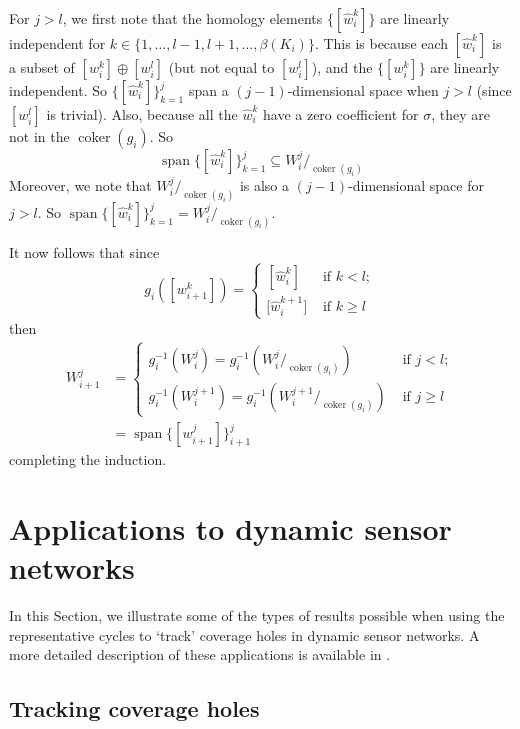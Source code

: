 \documentclass[12pt]{article}
\DeclareMathOperator{\coker}{coker}
\DeclareMathOperator{\spn}{span}
\begin{document}
For $j > l$, we first note that the homology elements $\{[\hat{w}_i^k]\}$ are linearly independent for $k\in \{1,\ldots,l-1,l+1,\ldots,\beta(K_i) \}$. This is because each $[\hat{w}_i^k]$ is a subset of $[w_i^k] \oplus [w_i^l]$ (but not equal to $[w_i^l]$), and the $\{[w_i^k]\}$ are linearly independent. So $\{[\hat{w}_i^k]\}_{k=1}^j$ span a $(j-1)$-dimensional space when $j>l$ (since $[w_i^l]$ is trivial). Also, because all the $\hat{w}_i^k$ have a zero coefficient for $\sigma$, they are not in the $\coker(g_i)$. So
\[ \spn \{[\hat{w}_i^k]\}_{k=1}^j \subseteq W_i^j /_{\coker(g_i)} \]
Moreover, we note that $W_i^j/_{\coker(g_i)}$ is also a $(j-1)$-dimensional space for $j>l$. So $\spn \{[\hat{w}_i^k]\}_{k=1}^j = W_i^j /_{\coker(g_i)}$.

It now follows that since
\[ g_i([w_{i+1}^k]) = \left\{ \begin{array}{ll}
                [\hat{w}_i^k] & \mbox{ if $k < l$};\\
                \mbox{[} \hat{w}_i^{k+1}] & \mbox{ if $k \geq l$} \end{array} \right. \]
then
\begin{align*}
W_{i+1}^j & = \left\{ \begin{array}{ll}
                g_i^{-1}(W_i^j) = g_i^{-1}(W_i^j/_{\coker(g_i)}) & \mbox{ if $j < l$};\\
                g_i^{-1}(W_i^{j+1}) = g_i^{-1}(W_i^{j+1} /_{\coker(g_i)})& \mbox{ if $j \geq l$}\end{array} \right. \\
          & = \spn \{[w_{i+1}^j]\}_{i+1}^j
\end{align*}
completing the induction.

\section{Applications to dynamic sensor networks}\label{Examples}

In this Section, we illustrate some of the types of results possible when using the representative cycles to `track' coverage holes in dynamic sensor networks. A more detailed description of these applications is available in \cite{Gamble2014b}.

\subsection{Tracking coverage holes}
\end{document}
